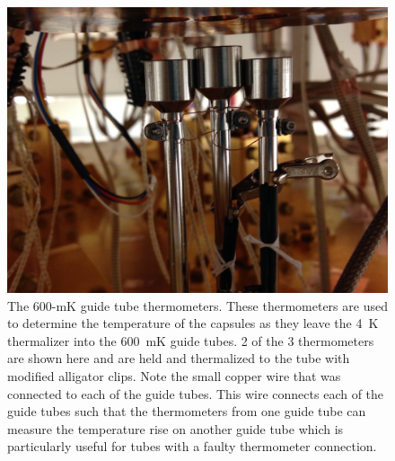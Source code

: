 \begin{figure}[htbp]
    \centering
    \includegraphics[width=0.8\linewidth]{Figures/ChicaneThermometers.JPG}
    \caption[The 600-mK guide tube thermometers.]
{The 600-mK guide tube thermometers.
These thermometers are used to determine the temperature of the capsules as they leave the 4~K thermalizer into the 600~mK guide tubes.
2 of the 3 thermometers are shown here and are held and thermalized to the tube with modified alligator clips.
Note the small copper wire that was connected to each of the guide tubes.
This wire connects each of the guide tubes such that the thermometers from one guide tube can measure the temperature rise on another guide tube which is particularly useful for tubes with a faulty thermometer connection.}
    \label{fig:600mK_thermometers}
\end{figure}


